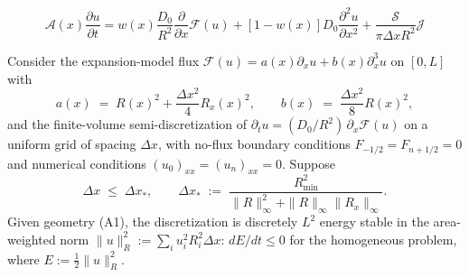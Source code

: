 \documentclass[10pt,a4paper]{amsart}
\begin{document}
\begin{equation}
    \mathcal{A}(x)\frac{\partial u}{\partial t} = w(x) \frac{D_0}{R^2} \frac{\partial}{\partial x} \mathcal{F}(u) + [1 - w(x)] D_0 \frac{\partial^2 u}{\partial x^2} + \frac{\mathcal{S}}{\pi\Delta x R^2} \mathcal{J} \label{eq:dFJ}
\end{equation}

\begin{lemma}\label{stab-lemma}
    Consider the expansion-model flux $\mathcal{F}(u) = a(x) \partial_x u + b(x) \partial_x^3 u$ on $[0, L]$ with
    \begin{equation}
        a(x) \;=\; R(x)^2 + \frac{\Delta x^2}{4} R_x(x)^2, \qquad b(x) \;=\; \frac{\Delta x^2}{8} R(x)^2, \label{eq:expansion-ab}
    \end{equation}
    and the finite-volume semi-discretization of $\partial_t u = (D_0/R^2)\, \partial_x \mathcal{F}(u)$ on a uniform grid of spacing $\Delta x$, with no-flux boundary conditions $F_{-1/2} = F_{n+1/2} = 0$ and numerical conditions $(u_0)_{xx} = (u_n)_{xx} = 0$. Suppose
    \begin{equation}
        \Delta x \;\leq\; \Delta x_*, \qquad \Delta x_* \;:=\; \frac{R_{\min}^2}{\|R\|_\infty^2 + \|R\|_\infty \|R_x\|_\infty}. \label{eq:stab-threshold}
    \end{equation}
    Given geometry (A1), the discretization is discretely $L^2$ energy stable in the area-weighted norm $\|u\|_R^2 := \sum_i u_i^2 R_i^2 \Delta x$: $dE/dt \leq 0$ for the homogeneous problem, where $E := \tfrac{1}{2} \|u\|_R^2$.
\end{lemma}
\end{document}
